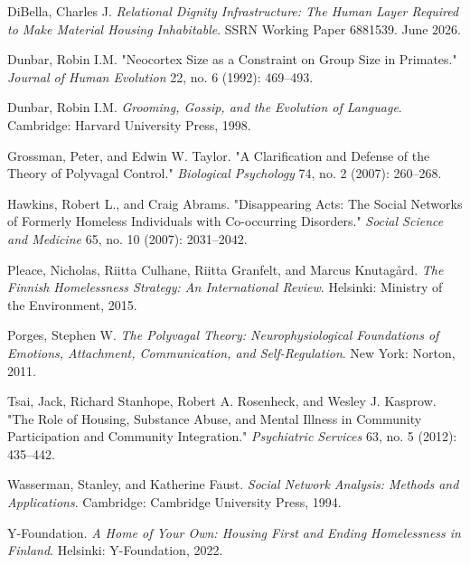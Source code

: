 \documentclass[12pt, letterpaper]{article}
\begin{document}
DiBella, Charles J. \textit{Relational Dignity Infrastructure: The Human Layer Required to Make Material Housing Inhabitable}. SSRN Working Paper 6881539. June 2026.

Dunbar, Robin I.M. "Neocortex Size as a Constraint on Group Size in Primates." \textit{Journal of Human Evolution} 22, no. 6 (1992): 469--493.

Dunbar, Robin I.M. \textit{Grooming, Gossip, and the Evolution of Language}. Cambridge: Harvard University Press, 1998.

Grossman, Peter, and Edwin W. Taylor. "A Clarification and Defense of the Theory of Polyvagal Control." \textit{Biological Psychology} 74, no. 2 (2007): 260–268.

Hawkins, Robert L., and Craig Abrams. "Disappearing Acts: The Social Networks of Formerly Homeless Individuals with Co-occurring Disorders." \textit{Social Science and Medicine} 65, no. 10 (2007): 2031–2042.

Pleace, Nicholas, Riitta Culhane, Riitta Granfelt, and Marcus Knutagård. \textit{The Finnish Homelessness Strategy: An International Review}. Helsinki: Ministry of the Environment, 2015.

Porges, Stephen W. \textit{The Polyvagal Theory: Neurophysiological Foundations of Emotions, Attachment, Communication, and Self-Regulation}. New York: Norton, 2011.

Tsai, Jack, Richard Stanhope, Robert A. Rosenheck, and Wesley J. Kasprow. "The Role of Housing, Substance Abuse, and Mental Illness in Community Participation and Community Integration." \textit{Psychiatric Services} 63, no. 5 (2012): 435–442.

Wasserman, Stanley, and Katherine Faust. \textit{Social Network Analysis: Methods and Applications}. Cambridge: Cambridge University Press, 1994.

Y-Foundation. \textit{A Home of Your Own: Housing First and Ending Homelessness in Finland}. Helsinki: Y-Foundation, 2022.
\end{document}

